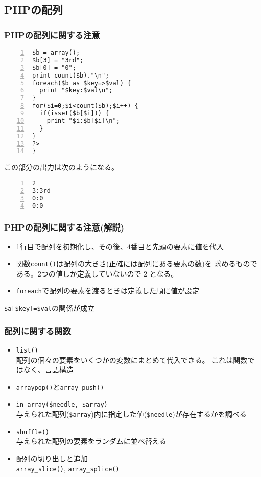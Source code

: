 \subsection{PHPの配列}
\begin{frame}[containsverbatim]
\frametitle{PHPの配列に関する注意}
\begin{Verbatim}[fontsize=\small,numbers=left]
$b = array();
$b[3] = "3rd";
$b[0] = "0";
print count($b)."\n";
foreach($b as $key=>$val) {
  print "$key:$val\n";
}
for($i=0;$i<count($b);$i++) {
  if(isset($b[$i])) {
    print "$i:$b[$i]\n";
  }
}
?>
}
\end{Verbatim}
この部分の出力は次のようになる。
\begin{Verbatim}[fontsize=\small,numbers=left]
2
3:3rd
0:0
0:0
\end{Verbatim}
\end{frame}%
\begin{frame}[containsverbatim]
\frametitle{PHPの配列に関する注意(解説)}
\begin{itemize}
 \item 1行目で配列を初期化し、その後、$4$番目と先頭の要素に値を代入
 \item 関数\texttt{count()}は配列の大きさ(正確には配列にある要素の数)を
       求めるものである。2つの値しか定義していないので $2$ となる。
 \item \texttt{foreach}で配列の要素を渡るときは定義した順に値が設定
\end{itemize}
\verb+$a[$key]=$val+の関係が成立
\end{frame}
\begin{frame}[containsverbatim]
\frametitle{配列に関する関数}
\begin{itemize}
 \item \texttt{list()}\\
  配列の個々の要素をいくつかの変数にまとめて代入できる。
これは関数ではなく、言語構造
 \item \texttt{array\textunderscore pop()}と\texttt{array\textunderscore
       push()}\\

 \item \verb+in_array($needle, $array)+\\
与えられた配列(\verb+$array+)内に指定した値(\verb+$needle+)が存在するかを調べる
 \item \verb+shuffle()+\\
与えられた配列の要素をランダムに並べ替える
 \item 配列の切り出しと追加\\
\verb+array_slice()+, \verb+array_splice()+
\end{itemize}
\end{frame}
